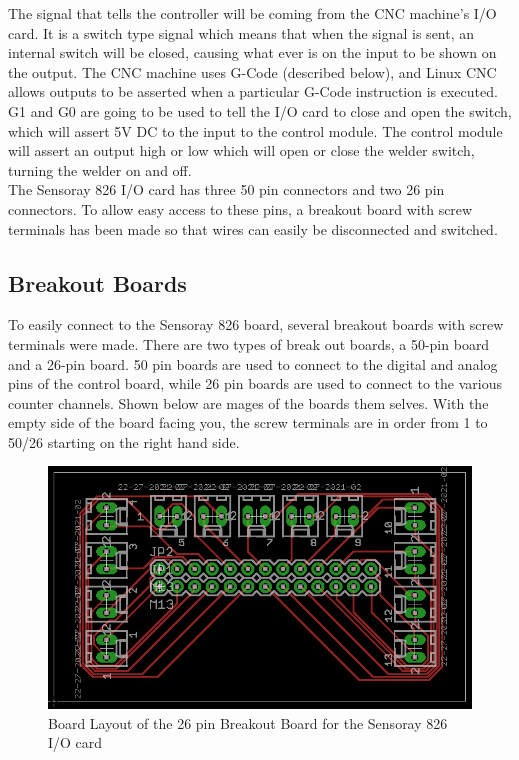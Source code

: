 \documentclass[12pt]{article}
\newlength\tindent
\renewcommand{\indent}{\hspace*{\tindent}}
\begin{document}
\indent The signal that tells the controller will be coming from the CNC machine's I/O card. It is a switch type signal which means that when the signal is sent, an internal switch will be closed, causing what ever is on the input to be shown on the output. The CNC machine uses G-Code (described below), and Linux CNC allows outputs to be asserted when a particular G-Code instruction is executed. G1 and G0 are going to be used to tell the I/O card to close and open the switch, which will assert 5V DC to the input to the control module. The control module will assert an output high or low which will open or close the welder switch, turning the welder on and off.\\ 

\indent The Sensoray 826 I/O card has three 50 pin connectors and two 26 pin connectors. To allow easy access to these pins, a breakout board with screw terminals has been made so that wires can easily be disconnected and switched.

\clearpage

\subsection{Breakout Boards}

\indent To easily connect to the Sensoray 826 board, several breakout boards with screw terminals were made. There are two types of break out boards, a 50-pin board and a 26-pin board. 50 pin boards are used to connect to the digital and analog pins of the control board, while 26 pin boards are used to connect to the various counter channels. Shown below are mages of the boards them selves. With the empty side of the board facing you, the screw terminals are in order from 1 to 50/26 starting on the right hand side. \\


\begin{figure}[!h]
\centering
\includegraphics[scale=0.5]{26}
\caption{Board Layout of the 26 pin Breakout Board for the Sensoray 826 I/O card}
\end{figure}
\end{document}
